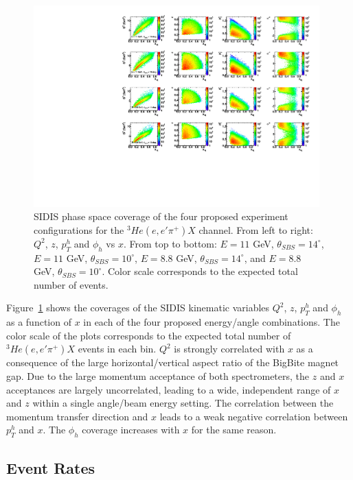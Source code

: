 \begin{figure}[h]
  \begin{center}
    \includegraphics[width=0.98\textwidth]{figures/kine14deg10deg_2Dcomparison.pdf}
  \end{center}
  \caption{\label{kine14_10_2D} SIDIS phase space coverage of the four proposed experiment configurations for the $^3He(e,e'\pi^+)X$ channel. From left to right: $Q^2$, $z$, $p_T^h$ and $\phi_h$ vs $x$. From top to bottom: $E = 11$ GeV, $\theta_{SBS} = 14^\circ$, $E = 11$ GeV, $\theta_{SBS}=10^\circ$, $E = 8.8$ GeV, $\theta_{SBS}=14^\circ$, and $E = 8.8$ GeV, $\theta_{SBS}=10^\circ$. Color scale corresponds to the expected total number of events.}
\end{figure}
Figure~\ref{kine14_10_2D} shows the coverages of the SIDIS kinematic variables $Q^2$, $z$, $p_T^h$ and $\phi_h$ as a function of $x$ in each of the four proposed energy/angle combinations. The color scale of the plots corresponds to the expected total number of $^3He(e,e'\pi^+)X$ events in each bin. $Q^2$ is strongly correlated with $x$ as a consequence of the large horizontal/vertical aspect ratio of the BigBite magnet gap. Due to the large momentum acceptance of both spectrometers, the $z$ and $x$ acceptances are largely uncorrelated, leading to a wide, independent range of $x$ and $z$ within a single angle/beam energy setting. The correlation between the momentum transfer direction and $x$ leads to a weak negative correlation between $p_T^h$ and $x$. The $\phi_h$ coverage increases with $x$ for the same reason.
\subsection{Event Rates}
